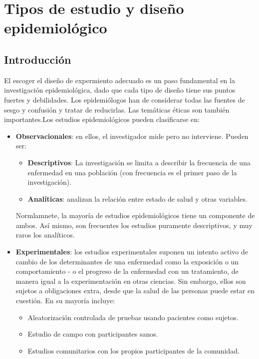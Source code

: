 \chapter{Tipos de estudio y diseño epidemiológico}
\section{Introducción}
El escoger el diseño de expermiento adecuado es un paso fundamental en la investigación epidemiológica, dado que cada tipo de diseño tiene sus puntos fuertes y debilidades. Los epidemiólogos han de considerar todas las fuentes de sesgo y confusión y tratar de reducirlas. Las temáticas éticas son también importantes.Los estudios epidemiológicos pueden clasificarse en:
\begin{itemize}[itemsep=0pt,parsep=0pt,topsep=0pt,partopsep=0pt]
	\item \textbf{Observacionales}: en ellos, el investigador mide pero no interviene. Pueden ser:
	\begin{itemize}[itemsep=0pt,parsep=0pt,topsep=0pt,partopsep=0pt]
		\item \textbf{Descriptivos}: La investigación se limita a describir la frecuencia de una enfermedad en una población (con frecuencia es el primer paso de la investigación).
		\item \textbf{Analíticas}: analizan la relación entre estado de salud y otras variables.
	\end{itemize}
	Normlamnete, la mayoría de estudios epidemiológicos tiene un componente de ambos. Así mismo, son frecuentes los estudios puramente descriptivos, y muy raros los analíticos.
	\item \textbf{Experimentales}: los estudios experimentales suponen un intento activo de cambio de los determinantes de una enfermedad como la exposición o un comportamiento - o el progreso de la enfermedad con un tratamiento, de manera igual a la experimentación en otras ciencias. Sin embargo, ellos son sujetos a obligaciones extra, desde que la salud de las personas puede estar en cuestión. En su mayoría incluye:
	\begin{itemize}[itemsep=0pt,parsep=0pt,topsep=0pt,partopsep=0pt]
		\item Aleatorización controlada de pruebas usando pacientes como sujetos.
		\item Estudio de campo con participantes sanos.
		\item Estudios comunitarios con los propios participantes de la comunidad.
	\end{itemize}
\end{itemize}
